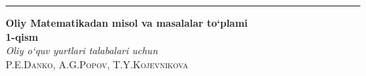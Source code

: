 \documentclass[a4paper, fontsize=12pt]{scrbook}
\begin{document}
\begin{titlepage} 
\pagecolor{cyan}\afterpage{\nopagecolor}
	\raggedleft 
	
	\rule{1pt}{\textheight} 
	\hspace{0.05\textwidth} 
	\parbox[b]{0.75\textwidth}{ 
		
		{\Huge\bfseries Oliy Matematikadan misol va masalalar to`plami\\1-qism}\\[2\baselineskip] 
		{\large\textit{Oliy o`quv yurtlari talabalari uchun}}\\[4\baselineskip] 
		{\Large\textsc{P.E.Danko, A.G.Popov, T.Y.Kojevnikova}} 
		
		\vspace{0.5\textheight} 
		
		{\noindent }\\[\baselineskip] 
	}
	
\end{titlepage}
	\renewcommand{\contentsname}{Mundarija}
	\tableofcontents
	
	
	
	
	
	
	
	
	
	
	
	
	
	
\end{document}
